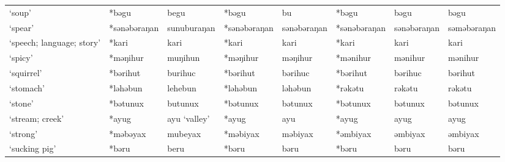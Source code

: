 \begin{landscape}
\begin{longtable}[c]{@{}p{3cm}<{\raggedright}p{2.75cm}<{\raggedright}p{2.75cm}<{\raggedright}p{2.75cm}<{\raggedright}p{2.75cm}<{\raggedright}p{2.75cm}<{\raggedright}p{2.75cm}<{\raggedright}p{2.75cm}<{\raggedright}@{}}
`soup'                                               & *bəgu              & begu                           & *bəgu              & bu                         & *bəgu            & bəgu                     & bəgu                              \\
`spear'                                              & *sənəbəraŋan       & sunuburaŋan                    & *sənəbəraŋan       & sənəbəraŋan                & *sənəbəraŋan     & sənəbəraŋan              & səməbəraŋan                       \\
`speech; language; story'                            & *kari              & kari                           & *kari              & kari                       & *kari            & kari                     & kari                              \\
`spicy'                                              & *məŋihur           & muŋihun                        & *məŋihur           & məŋihur                    & *mənihur         & mənihur                  & mənihur                           \\
`squirrel'                                           & *bərihut           & burihuc                        & *bərihut           & bərihuc                    & *bərihut         & bərihuc                  & bərihut                           \\
`stomach'                                            & *ləhəbun           & lehebun                        & *ləhəbun           & ləhəbun                    & *rəkətu          & rəkətu                   & rəkətu                            \\
`stone'                                              & *bətunux           & butunux                        & *bətunux           & bətunux                    & *bətunux         & bətunux                  & bətunux                           \\
`stream; creek'                                      &  *ayug             & ayu `valley'                   & *ayug              & ayu                        & *ayug            & ayug                     & ayug                              \\
`strong'                                             & *məbəyax           & mubeyax                        & *məbiyax           & məbiyax                    & *əmbiyax         & əmbiyax                  & əmbiyax                           \\
`sucking pig'                                        & *bəru              & beru                           & *bəru              & bəru                       & *bəru            & bəru                     & bəru                              \\

\end{longtable}
\end{landscape}
